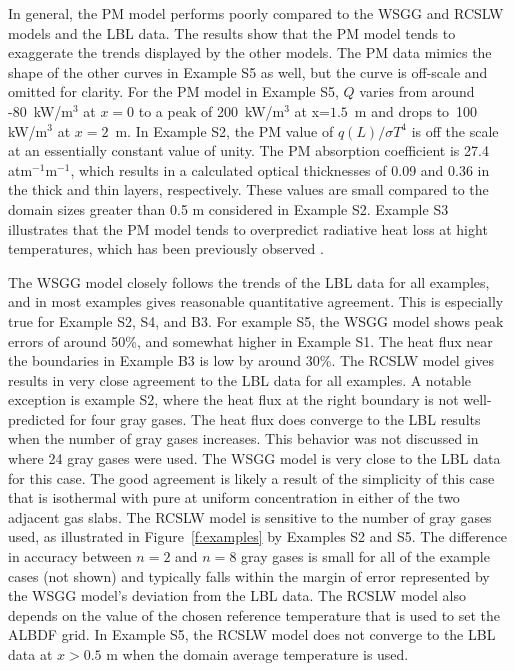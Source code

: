 \documentclass[preprint,12pt]{elsarticle}
\begin{document}
    In general, the PM model performs poorly compared to the WSGG and RCSLW models and the LBL data. The results show that the PM model tends to exaggerate the trends displayed by the other models. The PM data mimics the shape of the other curves in Example S5 as well, but the curve is off-scale and omitted for clarity. For the PM model in Example S5, $Q$ varies from around -80~kW/m$^3$ at $x=0$ to a peak of 200~kW/m$^3$ at x=$1.5$~m and drops to~100 kW/m$^3$ at $x=2$~m.
    In Example S2, the PM value of $q(L)/\sigma T^4$ is off the scale at an essentially constant value of unity. The PM absorption coefficient is 27.4 atm$^{-1}$m$^{-1}$, which results in a calculated optical thicknesses of 0.09 and 0.36 in the thick and thin layers, respectively. These values are small compared to the domain sizes greater than 0.5 m considered in Example S2.
    Example S3 illustrates that the PM model tends to overpredict radiative heat loss at hight temperatures, which has been previously observed \cite{Frank_2000,Zhu_2002,Coelho_2002}.

    The WSGG model closely follows the trends of the LBL data for all examples, and in most examples gives reasonable quantitative agreement. This is especially true for Example S2, S4, and B3. For example S5, the WSGG model shows peak errors of around 50\%, and somewhat higher in Example S1. The heat flux near the boundaries in Example B3 is low by around 30\%. The RCSLW model gives results in very close agreement to the LBL data for all examples. A notable exception is example S2, where the heat flux at the right boundary is not well-predicted for four gray gases. The heat flux does converge to the LBL results when the number of gray gases increases. This behavior was not discussed in \cite{Solovjov_2017} where 24 gray gases were used. The WSGG model is very close to the LBL data for this case. The good agreement is likely a result of the simplicity of this case that is isothermal with pure  at uniform concentration in either of the two adjacent gas slabs.
    The RCSLW model is sensitive to the number of gray gases used, as illustrated in Figure~\ref{f:examples} by Examples S2 and S5. The difference in accuracy between $n=2$ and $n=8$ gray gases is small for all of the example cases (not shown) and typically falls within the margin of error represented by the WSGG model's deviation from the LBL data.
    The RCSLW model also depends on the value of the chosen reference temperature that is used to set the ALBDF grid. In Example S5, the RCSLW model does not converge to the LBL data at $x>0.5$ m when the domain average temperature is used.
\end{document}
